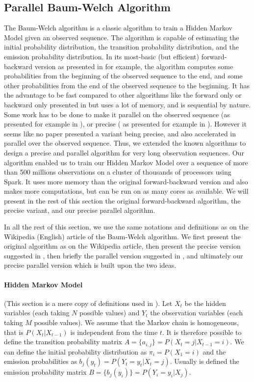 \subsection{Parallel Baum-Welch Algorithm}
The Baum-Welch algorithm is a classic algorithm to train a Hidden Markov Model given an observed sequence. The algorithm is capable of estimating the initial probability distribution, the transition probability distribution, and the emission probability distribution.
In its most-basic (but efficient) forward-backward version as presented in \cite{rabiner1989tutorial} for example, the algorithm computes some probabilities from the beginning of the observed sequence to the end, and some other probabilities from the end of the observed sequence to the beginning. It has the advantage to be fast compared to other algorithms like the forward only or backward only presented in \cite{turin1998unidirectional} but uses a lot of memory, and is sequential by nature.
Some work has to be done to make it parallel on the observed sequence (as presented for example in \cite{turin1998unidirectional}), or precise ( as presented for example in \cite{rabiner1989tutorial}). However it seems like no paper presented a variant being precise, and also accelerated in parallel over the observed sequence.
Thus, we extended the known algorithms to design a precise and parallel algorithm for very long observation sequences.
Our algorithm enabled us to train our Hidden Markov Model over a sequence of more than 500 millions observations on a cluster of thousands of processors using Spark. It uses more memory than the original forward-backward version and also makes more computations, but can be run on as many cores as available.
We will present in the rest of this section the original forward-backward algorithm, the precise variant, and our precise parallel algorithm.

In all the rest of this section, we use the same notations and definitions as on the Wikipedia (English) article of the Baum-Welch algorithm. We first present the original algorithm as on the Wikipedia article, then present the precise version suggested in \cite{rabiner1989tutorial}, then briefly the parallel version suggested in \cite{turin1998unidirectional}, and ultimately our precise parallel version which is built upon the two ideas.

\paragraph{Hidden Markov Model}
(This section is a mere copy of definitions used in \cite{wiki:BaumWelch_algorithm}).
Let $X_t$ be the hidden variables (each taking $N$ possible values) and $Y_t$ the observation variables (each taking $M$ possible values). We assume that the Markov chain is homogeneous, that is $P(X_t|X_{t-1})$ is independent from the time $t$.
It is therefore possible to define the transition probability matrix $A = \{a_{i,j}\} = P(X_t = j | X_{t-1} = i)$.
We can define the initial probability distribution as $\pi_i = P(X_1=i)$ and the emission probabilities as $b_j(y_t) = P(Y_t = y_t | X_t = j)$. Usually is defined the emission probability matrix $B = \{b_j(y_i)\} = P(Y_i=y_i | X_j)$.

